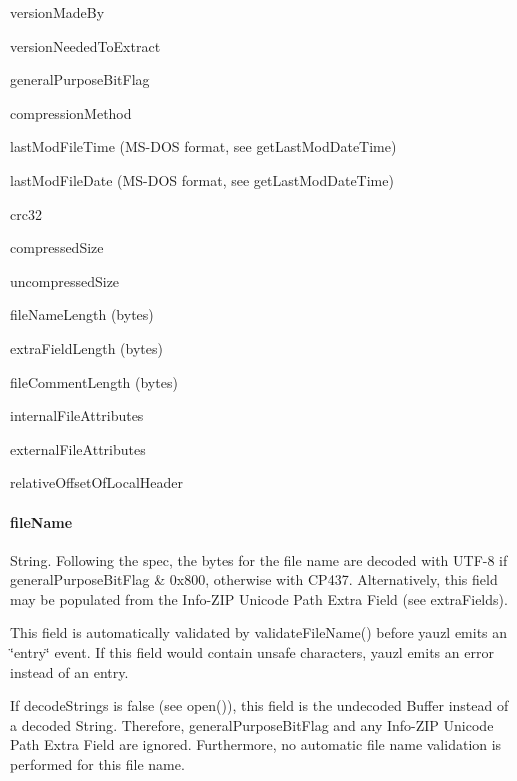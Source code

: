 \begin{DoxyItemize}
\item {\ttfamily version\+Made\+By}
\item {\ttfamily version\+Needed\+To\+Extract}
\item {\ttfamily general\+Purpose\+Bit\+Flag}
\item {\ttfamily compression\+Method}
\item {\ttfamily last\+Mod\+File\+Time} (M\+S-\/\+D\+OS format, see {\ttfamily get\+Last\+Mod\+Date\+Time})
\item {\ttfamily last\+Mod\+File\+Date} (M\+S-\/\+D\+OS format, see {\ttfamily get\+Last\+Mod\+Date\+Time})
\item {\ttfamily crc32}
\item {\ttfamily compressed\+Size}
\item {\ttfamily uncompressed\+Size}
\item {\ttfamily file\+Name\+Length} (bytes)
\item {\ttfamily extra\+Field\+Length} (bytes)
\item {\ttfamily file\+Comment\+Length} (bytes)
\item {\ttfamily internal\+File\+Attributes}
\item {\ttfamily external\+File\+Attributes}
\item {\ttfamily relative\+Offset\+Of\+Local\+Header}
\end{DoxyItemize}

\paragraph*{file\+Name}

{\ttfamily String}. Following the spec, the bytes for the file name are decoded with {\ttfamily U\+T\+F-\/8} if {\ttfamily general\+Purpose\+Bit\+Flag \& 0x800}, otherwise with {\ttfamily C\+P437}. Alternatively, this field may be populated from the Info-\/\+Z\+IP Unicode Path Extra Field (see {\ttfamily extra\+Fields}).

This field is automatically validated by {\ttfamily validate\+File\+Name()} before yauzl emits an \char`\"{}entry\char`\"{} event. If this field would contain unsafe characters, yauzl emits an error instead of an entry.

If {\ttfamily decode\+Strings} is {\ttfamily false} (see {\ttfamily open()}), this field is the undecoded {\ttfamily Buffer} instead of a decoded {\ttfamily String}. Therefore, {\ttfamily general\+Purpose\+Bit\+Flag} and any Info-\/\+Z\+IP Unicode Path Extra Field are ignored. Furthermore, no automatic file name validation is performed for this file name.

